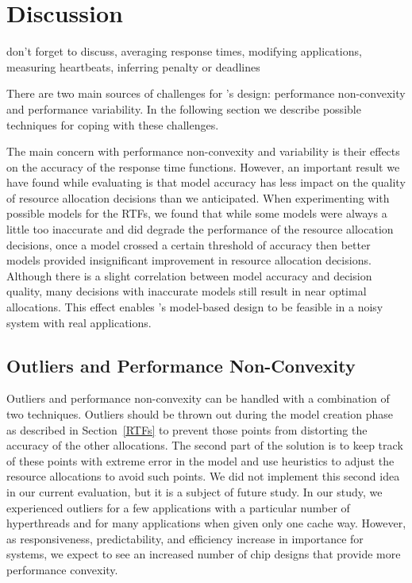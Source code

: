 \chapter{Discussion}\label{discuss}

don't forget to discuss, averaging response times, modifying applications, measuring heartbeats, inferring penalty or deadlines

There are two main sources of challenges for \pacora's design: performance non-convexity and performance variability.  In the following section we describe possible techniques for coping with these challenges.

The main concern with performance non-convexity and variability is their effects on the accuracy of the response time functions.  However, an important result we have found while evaluating \pacora is that model accuracy has less impact on the quality of resource allocation decisions than we anticipated.  When experimenting with possible models for the RTFs, we found that while some models were always a little too inaccurate and did degrade the performance of the resource allocation decisions, once a model crossed a certain threshold of accuracy then better models provided insignificant improvement in resource allocation decisions.  Although there is a slight correlation between model accuracy and decision quality, many decisions with inaccurate models still result in near optimal allocations.  This effect enables \pacora's model-based design to be feasible in a noisy system with real applications.

\section{Outliers and Performance Non-Convexity}

Outliers and performance non-convexity can be handled with a combination of two techniques.  Outliers should be thrown out during the model creation phase as described in Section~\ref{RTFs} to prevent those points from distorting the accuracy of the other allocations.  The second part of the solution is to keep track of these points with extreme error in the model and use heuristics to adjust the resource allocations to avoid such points.  We did not implement this second idea in our current evaluation, but it is a subject of future study.  In our study, we experienced outliers for a few applications with a particular number of hyperthreads and for many applications when given only one cache way. However, as responsiveness, predictability, and efficiency increase in importance for systems, we expect to see an increased number of chip designs that provide more performance convexity.

